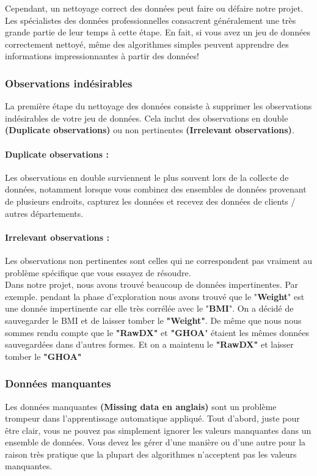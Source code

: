 \documentclass[12pt, french]{article}
\begin{document}
Cependant, un nettoyage correct des données peut faire ou défaire notre projet. Les spécialistes des données professionnelles consacrent généralement une très grande partie de leur temps à cette étape. En fait, si vous avez un jeu de données correctement nettoyé, même des algorithmes simples peuvent apprendre des informations impressionnantes à partir des données!

\subsubsection{Observations indésirables} La première étape du nettoyage des données consiste à supprimer les observations indésirables de votre jeu de données. Cela inclut des observations en double \textbf{(Duplicate observations)} ou non pertinentes \textbf{(Irrelevant observations)}.

\paragraph{Duplicate observations :} Les observations en double surviennent le plus souvent lors de la collecte de données, notamment lorsque vous combinez des ensembles de données provenant de plusieurs endroits, capturez les données et recevez des données de clients / autres départements.

\paragraph{Irrelevant observations :} Les observations non pertinentes sont celles qui ne correspondent pas vraiment au problème spécifique que vous essayez de résoudre. \\

Dans notre projet, nous avons trouvé beaucoup de données impertinentes. Par exemple. pendant la phase d'exploration nous avons trouvé que le "\textbf{Weight}" est une donnée impertinente car elle très corrélée avec le "\textbf{BMI}". On a décidé de sauvegarder le BMI et de laisser tomber le \textbf{"Weight"}.  De même que nous nous sommes rendu compte que le \textbf{"RawDX"} et \textbf{"GHOA}" étaient les mêmes données sauvegardées dans d'autres formes. Et on a maintenu le \textbf{"RawDX"} et laisser tomber le \textbf{"GHOA"}

\subsubsection{Données manquantes}
Les données manquantes \textbf{(Missing data en anglais)} sont un problème trompeur dans l'apprentissage automatique appliqué. Tout d'abord, juste pour être clair, vous ne pouvez pas simplement ignorer les valeurs manquantes dans un ensemble de données. Vous devez les gérer d'une manière ou d'une autre pour la raison très pratique que la plupart des algorithmes n'acceptent pas les valeurs manquantes.\\
\end{document}
